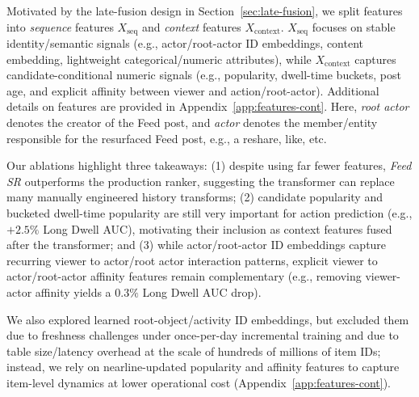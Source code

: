 \documentclass[sigconf]{acmart}
\newcommand{\systemname}{\textit{Feed SR}}
\begin{document}
Motivated by the late-fusion design in Section~\ref{sec:late-fusion}, we split features into \emph{sequence} features $X_{\text{seq}}$ and \emph{context} features $X_{\text{context}}$. $X_{\text{seq}}$ focuses on stable identity/semantic signals (e.g., actor/root-actor ID embeddings, content embedding, lightweight categorical/numeric attributes), while $X_{\text{context}}$ captures candidate-conditional numeric signals (e.g., popularity, dwell-time buckets, post age, and explicit affinity between viewer and action/root-actor). Additional details on features are provided in Appendix~\ref{app:features-cont}. Here, \emph{root actor} denotes the creator of the Feed post, and \emph{actor} denotes the member/entity responsible for the resurfaced Feed post, e.g., a reshare, like, etc. 

Our ablations highlight three takeaways: (1) despite using far fewer features, {\systemname} outperforms the production ranker, suggesting the transformer can replace many manually engineered history transforms; (2) candidate popularity and bucketed dwell-time popularity are still very important for action prediction (e.g., $+2.5\%$ Long Dwell AUC), motivating their inclusion as context features fused after the transformer; and (3) while actor/root-actor ID embeddings capture recurring viewer to actor/root actor interaction patterns, explicit viewer to actor/root-actor affinity features remain complementary (e.g., removing viewer-actor affinity yields a $0.3\%$ Long Dwell AUC drop).

We also explored learned root-object/activity ID embeddings, but excluded them due to freshness challenges under once-per-day incremental training and due to table size/latency overhead at the scale of hundreds of millions of item IDs; instead, we rely on nearline-updated popularity and affinity features to capture item-level dynamics at lower operational cost (Appendix~\ref{app:features-cont}).
\end{document}
